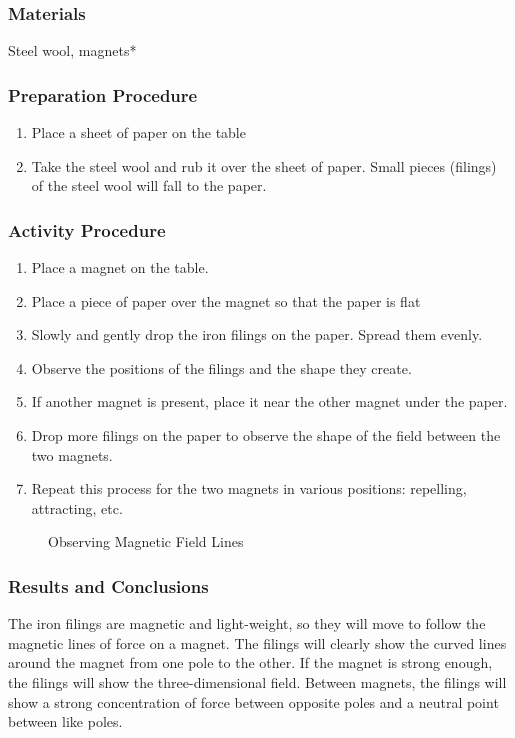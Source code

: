 \subsubsection*{Materials}
Steel wool, magnets*

\subsubsection*{Preparation Procedure}
\begin{enumerate}
\item{Place a sheet of paper on the table}
\item{Take the steel wool and rub it over the sheet of paper.  Small pieces (filings) of the steel wool will fall to the paper.}
\end{enumerate}

\subsubsection*{Activity Procedure}
\begin{enumerate}
\item{Place a magnet on the table.}
\item{Place a piece of paper over the magnet so that the paper is flat}
\item{Slowly and gently drop the iron filings on the paper.  Spread them evenly.}
\item{Observe the positions of the filings and the shape they create.}
\item{If another magnet is present, place it near the other magnet under the paper.}
\item{Drop more filings on the paper to observe the shape of the field between the two magnets.}
\item{Repeat this process for the two magnets in various positions: repelling, attracting, etc.}
\end{enumerate}

\begin{figure}
\begin{center}
\def\svgwidth{150pt}

\caption{Observing Magnetic Field Lines}
\label{fig:magnetic-fields}
\end{center}
\end{figure}

\subsubsection*{Results and Conclusions}
The iron filings are magnetic and light-weight, so they will move to follow the magnetic lines of force on a magnet.  The filings will clearly show the curved lines around the magnet from one pole to the other.  If the magnet is strong enough, the filings will show the three-dimensional field.
Between magnets, the filings will show a strong concentration of force between opposite poles and a neutral point between like poles.

